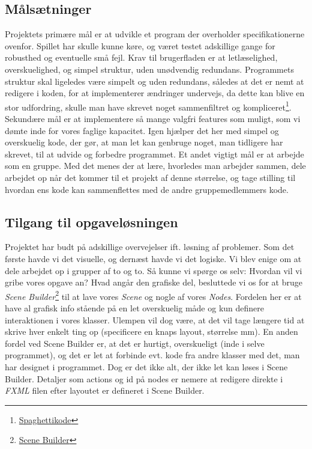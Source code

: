 \subsection{Målsætninger}\label{MS}
Projektets primære mål er at udvikle et program der overholder specifikationerne ovenfor. Spillet har skulle kunne køre, og været testet adskillige gange for robusthed og eventuelle små fejl.\newline
Krav til brugerfladen er at letlæselighed, overskuelighed, og simpel struktur, uden unødvendig redundans. \newline
Programmets struktur skal ligeledes være simpelt og uden redundans, således at det er nemt at redigere i koden, for at implementerer ændringer undervejs, da dette kan blive en stor udfordring, skulle man have skrevet noget sammenfiltret og kompliceret\footnote{\href{https://www.wikiwand.com/en/Spaghetti_code}{Spaghettikode}}.\newline
Sekundære mål er at implementere så mange valgfri features som muligt, som vi dømte inde for vores faglige kapacitet. Igen hjælper det her med simpel og overskuelig kode, der gør, at man let kan genbruge noget, man tidligere har skrevet, til at udvide og forbedre programmet.\newline
Et andet vigtigt mål er at arbejde som en gruppe. Med det menes der at lære, hvorledes man arbejder sammen, dele arbejdet op når det kommer til et projekt af denne størrelse, og tage stilling til hvordan ens kode kan sammenflettes med de andre gruppemedlemmers kode.
\subsection{Tilgang til opgaveløsningen}\label{TTO}
Projektet har budt på adskillige overvejelser ift. løsning af problemer. Som det første havde vi det visuelle, og dernæst havde vi det logiske. Vi blev enige om at dele arbejdet op i grupper af to og to. Så kunne vi spørge os selv: Hvordan vil vi gribe vores opgave an? Hvad angår den grafiske del, besluttede vi os for at bruge \emph{Scene Builder}\footnote{\href{https://gluonhq.com/products/scene-builder/}{Scene Builder}} til at lave vores \emph{Scene} og nogle af vores \emph{Nodes}. Fordelen her er at have al grafisk info stående på en let overskuelig måde og kun definere interaktionen i vores klasser. Ulempen vil dog være, at det vil tage længere tid at skrive hver enkelt ting op (specificere en knaps layout, størrelse mm). En anden fordel ved Scene Builder er, at det er hurtigt, overskueligt (inde i selve programmet), og det er let at forbinde evt. kode fra andre klasser med det, man har designet i programmet.\newline
Dog er det ikke alt, der ikke let kan løses i Scene Builder. Detaljer som actions og id på nodes er nemere at redigere direkte i \emph{FXML} filen efter layoutet er defineret i Scene Builder.\newline


